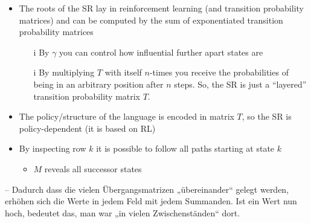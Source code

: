 \begin{frame}[label={frame: sr}]
{{\begin{itemize}
        \begin{itemize}
            \item Where does the claim originate?
            \item Stachenfeld et al. tested different environments with classical navigational tasks (not abstract ones like placing cars), for instance the maze depicted earlier. They even had comparative data from rats and humans acting in their cognitive rooms and achieved promising results by applying the theory I am presenting.
            \item the SR is kinda the Mathematification of these concepts
        \end{itemize}
        \item The roots of the SR lay in reinforcement learning (and transition probability matrices) and can be computed by the sum of exponentiated transition probability matrices
        \begin{itemize}
    		\item[i] By $ \gamma $ you can control how influential further apart states are
            \item[i] By multiplying $ T $ with itself $ n $-times you receive the probabilities of being in an arbitrary position after $ n $ steps. So, the SR is just a ``layered'' transition probability matrix $ T $.
        \end{itemize}
        \item The policy/structure of the language is encoded in matrix $ T $, so the SR is policy-dependent (it is based on RL)
        \item By inspecting row $ k $ it is possible to follow all paths starting at state $ k $
        \begin{itemize}
            \item $ M $ reveals all successor states
        \end{itemize}
	\end{itemize}
	-- Dadurch dass die vielen Übergangsmatrizen „übereinander“ gelegt werden, erhöhen sich die Werte in jedem Feld mit jedem Summanden. Ist ein Wert nun hoch, bedeutet das, man war „in vielen Zwischenständen“ dort.
}
}
\end{frame}
